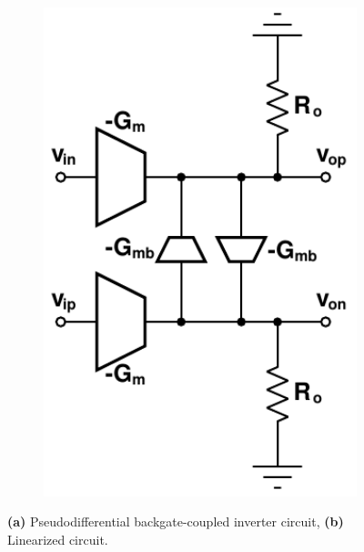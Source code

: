 \begin{figure}[htb!]
			    \hspace{5em}
			    \begin{subfigure}{0.35\textwidth}
			        \centering
			        \includegraphics[width=1\textwidth, angle=0]{./figs/design/pseudodiff_buff_linear}
			        \caption{ }
			        \label{fig:pseudodiff_linearized}
			    \end{subfigure}
			    \caption{\textbf{(a)} Pseudodifferential backgate-coupled inverter circuit, \textbf{(b)} Linearized circuit.}
			    \label{fig:pd_cir_inv_model}
			\end{figure} 

